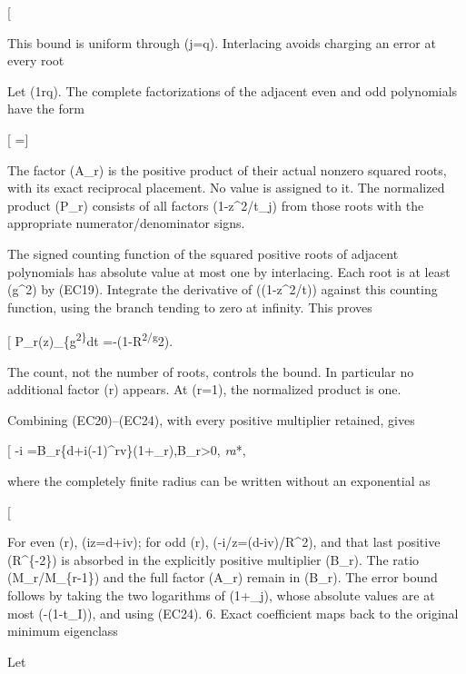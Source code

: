 {[}  \tag{EC22}{]}

This bound is uniform through (j=q). Interlacing avoids charging an error at every root

Let (1\le r\le q). The complete factorizations of the adjacent even and odd polynomials have the form

{[}  ={]}

The factor (A\_r) is the positive product of their actual nonzero squared roots, with its exact reciprocal placement. No value is assigned to it. The normalized product (\mathcal P\_r) consists of all factors (1-z\^{}2/t\_j) from those roots with the appropriate numerator/denominator signs.

The signed counting function of the squared positive roots of adjacent polynomials has absolute value at most one by interlacing. Each root is at least (g\^{}2) by (EC19). Integrate the derivative of (\log(1-z\^{}2/t)) against this counting function, using the branch tending to zero at infinity. This proves

{[} \textbar{}\log\mathcal P\_r(z)\textbar{}\le \int\_\{g\textsuperscript{2\}}\infty{}dt =-\log(1-R\textsuperscript{2/g}2). \tag{EC24}{]}

The count, not the number of roots, controls the bound. In particular no additional factor (r) appears. At (r=1), the normalized product is one.

Combining (EC20)--(EC24), with every positive multiplier retained, gives

{[} -i =B\_r\{d+i(-1)\^{}rv\}(1+\varepsilon\_r),\qquad B\_r\textgreater0, \quad \textbar{}\varepsilon\emph{r\textbar{}\le a}*, \tag{EC25}{]}

where the completely finite radius can be written without an exponential as

{[}  \tag{EC26}{]}

For even (r), (iz=d+iv); for odd (r), (-i/z=(d-iv)/R\^{}2), and that last positive (R\^{}\{-2\}) is absorbed in the explicitly positive multiplier (B\_r). The ratio (M\_r/M\_\{r-1\}) and the full factor (A\_r) remain in (B\_r). The error bound follows by taking the two logarithms of (1+\epsilon\_j), whose absolute values are at most (-\log(1-t\_I)), and using (EC24). 6. Exact coefficient maps back to the original minimum eigenclass

Let

